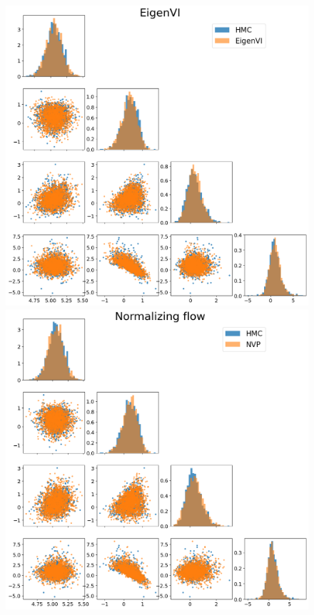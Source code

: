 \begin{figure}
    \centering
    \includegraphics[scale=0.23]{figs/expts-pdb/PDB_99_samples_eigenvi.png}
    \\
    \includegraphics[scale=0.23]{figs/expts-pdb/PDB_99_samples_flow.png}

\end{figure}
